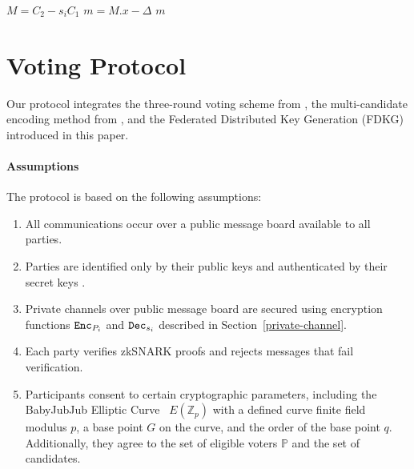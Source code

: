 \documentclass[runningheads]{llncs}
\begin{document}
\begin{algorithm}
    \caption{$\texttt{Dec}_{s_i}$}
    \label{alg:decryption}
    
    
    $M = C_2 - s_i C_1$\;
    $m = M.x - \Delta$\;
    \Return $m$
\end{algorithm}

\section{Voting Protocol}

Our protocol integrates the three-round voting scheme from \cite{schoenmakersLectureNotesCryptographic2018}, the multi-candidate encoding method from \cite{haoAnonymousVotingTworound2010}, and the Federated Distributed Key Generation (FDKG) introduced in this paper.

\paragraph*{Assumptions}
The protocol is based on the following assumptions:
\begin{enumerate}
\item All communications occur over a public message board available to all parties.
\item Parties are identified only by their public keys  and authenticated by their secret keys .
\item Private channels over public message board are secured using encryption functions $\texttt{Enc}_{P_{i}}$ and $\texttt{Dec}_{s_{i}}$ described in Section~\ref{private-channel}.
\item Each party verifies zkSNARK proofs and rejects messages that fail verification.
\item Participants consent to certain cryptographic parameters, including the BabyJubJub Elliptic Curve~\cite{whitehatBabyJubjubElliptic2020} $E(\mathbb{Z}_p)$ with a defined curve finite field modulus $p$, a base point $G$ on the curve, and the order of the base point $q$. Additionally, they agree to the set of eligible voters $\mathbb{P}$ and the set of candidates.
\end{enumerate}
\end{document}
